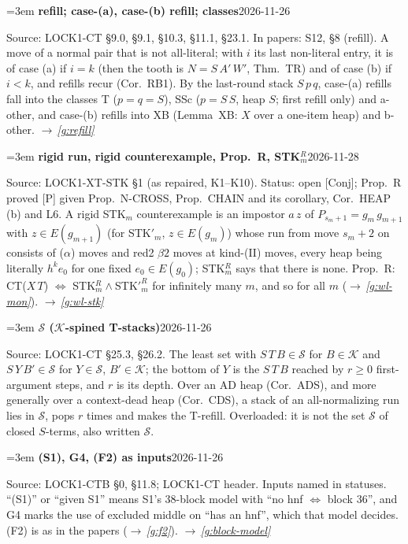 \documentclass[11pt]{amsart}
\makeatletter
\newcommand{\Ter}{\mathcal S}
\newcommand{\Kc}{\mathcal K}
\newcounter{sense}
\newenvironment{entry}[3]{%
  \par\addvspace{\medskipamount}\noindent\phantomsection
  \def\@currentlabel{#2}\label{#1}\setcounter{sense}{0}\raggedright\emergencystretch=3em%
  \textbf{#2}\hfill{\footnotesize\textsf{#3}}\par\nopagebreak\noindent\ignorespaces}%
  {\par}
\newcommand{\src}[1]{\textsf{Source:} #1.\enskip}
\newcommand{\status}[1]{\textsf{Status:} #1.\enskip}
\newcommand{\appears}[1]{\textsf{In papers:} #1.\enskip}
\renewcommand{\see}[1]{$\rightarrow$\,\emph{\ref{#1}}}
\makeatother
\begin{document}
\begin{entry}{g:wl-refill}{refill; case-(a), case-(b) refill; classes}{2026-11-26}
\src{LOCK1-CT \S9.0, \S9.1, \S10.3, \S11.1, \S23.1}
\appears{S12, \S8 (refill)}
A move of a normal pair that is not all-literal; with $i$ its last non-literal entry, it is of case
(a) if $i=k$ (then the tooth is $N=S\,A'\,W'$, Thm.~TR) and of case (b) if $i<k$, and refills recur
(Cor.~RB1). By the last-round stack $S\,p\,q$, case-(a) refills fall into the classes T ($p=q=S$), SSc
($p=S\,S$, heap $S$; first refill only) and a-other, and case-(b) refills into XB (Lemma~XB: $X$ over a
one-item heap) and b-other. \see{g:refill}
\end{entry}

\begin{entry}{g:wl-rigid}{rigid run, rigid counterexample, Prop.~R, STK$^R_m$}{2026-11-28}
\src{LOCK1-XT-STK \S1 (as repaired, K1--K10)}
\status{open [Conj]; Prop.~R proved [P] given Prop.~N-CROSS, Prop.~CHAIN and its corollary, Cor.~HEAP (b)
and L6}
A rigid STK$_m$ counterexample is an impostor $a\,z$ of $P_{s_m+1}=g_m\,g_{m+1}$ with $z\in E(g_{m+1})$ (for
STK$'_m$, $z\in E(g_m)$) whose run from move $s_m+2$ on consists of ($\alpha$) moves and red2 $\beta2$
moves at kind-(II) moves, every heap being literally $h^ke_0$ for one fixed $e_0\in E(g_0)$; STK$^R_m$ says
that there is none. Prop.~R: CT($X\,T$) $\Leftrightarrow$ STK$^R_m\wedge{}$STK$'^R_m$ for infinitely many
$m$, and so for all $m$ (\see{g:wl-mon}). \see{g:wl-stk}
\end{entry}

\begin{entry}{g:wl-calS}{$\mathcal{S}$ ($\Kc$-spined T-stacks)}{2026-11-26}
\src{LOCK1-CT \S25.3, \S26.2}
The least set with $S\,T\,B\in\mathcal{S}$ for $B\in\Kc$ and $S\,Y\,B'\in\mathcal{S}$ for
$Y\in\mathcal{S}$, $B'\in\Kc$; the bottom of $Y$ is the $S\,T\,B$ reached by $r\ge0$ first-argument
steps, and $r$ is its depth. Over an AD heap (Cor.~ADS), and more generally over a context-dead heap
(Cor.~CDS), a stack of an all-normalizing run lies in $\mathcal{S}$, pops $r$ times and makes the
T-refill. Overloaded: it is not the set $\Ter$ of closed $S$-terms, also written $\mathcal S$.
\end{entry}

\begin{entry}{g:wl-s1}{(S1), G4, (F2) as inputs}{2026-11-26}
\src{LOCK1-CTB \S0, \S11.8; LOCK1-CT header}
Inputs named in statuses. ``(S1)'' or ``given S1'' means S1's 38-block model with ``no hnf
$\Leftrightarrow$ block 36'', and G4 marks the use of excluded middle on ``has an hnf'', which that
model decides. (F2) is as in the papers (\see{g:f2}). \see{g:block-model}
\end{entry}
\end{document}
